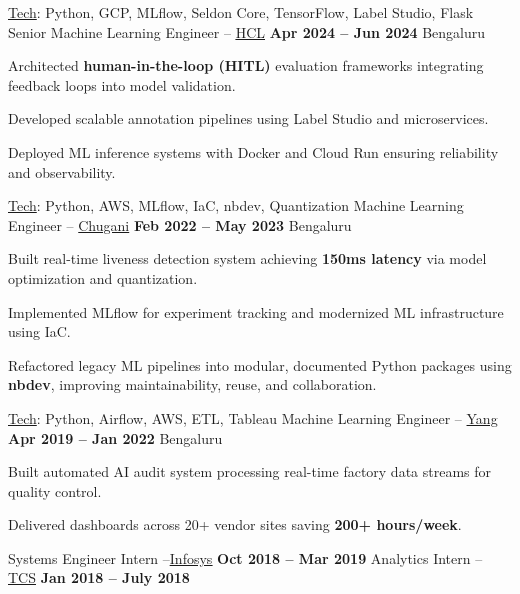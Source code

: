 \documentclass[11pt, a4paper]{awesome-cv}
\begin{document}
\begin{cventries}
\vspace{1.0em}

\cventry
{\underline{Tech}: Python, GCP, MLflow, Seldon Core, TensorFlow, Label Studio, Flask}
{Senior Machine Learning Engineer – \underline{\href{https://www.hcltech.com/}{HCL}}}
{\textbf{Apr 2024 – Jun 2024}}
{Bengaluru}
{
\begin{cvitems}
  \item {Architected \textbf{human-in-the-loop (HITL)} evaluation frameworks integrating feedback loops into model validation.}
  \item {Developed scalable annotation pipelines using Label Studio and microservices.}
  \item {Deployed ML inference systems with Docker and Cloud Run ensuring reliability and observability.}
\end{cvitems}
}

\vspace{1.0em}

\cventry
{\underline{Tech}: Python, AWS, MLflow, IaC, nbdev, Quantization}
{Machine Learning Engineer – \underline{Chugani}}
{\textbf{Feb 2022 – May 2023}}
{Bengaluru}
{
\begin{cvitems}
  \item {Built real-time liveness detection system achieving \textbf{150ms latency} via model optimization and quantization.}
  \item {Implemented MLflow for experiment tracking and modernized ML infrastructure using IaC.}
  \item {Refactored legacy ML pipelines into modular, documented Python packages using \textbf{nbdev}, improving maintainability, reuse, and collaboration.}
\end{cvitems}
}

\vspace{1.0em}

\cventry
{\underline{Tech}: Python, Airflow, AWS, ETL, Tableau}
{Machine Learning Engineer – \underline{Yang}}
{\textbf{Apr 2019 – Jan 2022}}
{Bengaluru}
{
\begin{cvitems}
  \item {Built automated AI audit system processing real-time factory data streams for quality control.}
  \item {Delivered dashboards across 20+ vendor sites saving \textbf{200+ hours/week}.}
\end{cvitems}
}

\vspace{1.0em}

\cventry{} {Systems Engineer Intern –\underline{\href{https://www.infosys.com/}{Infosys}}} {\textbf{Oct 2018 – Mar 2019}} {} {}
\vspace{-2.0em}
\cventry{} {Analytics Intern – \underline{\href{https://www.tcs.com/}{TCS}}} {\textbf{Jan 2018 – July 2018}} {} {}

\end{cventries}
\end{document}

